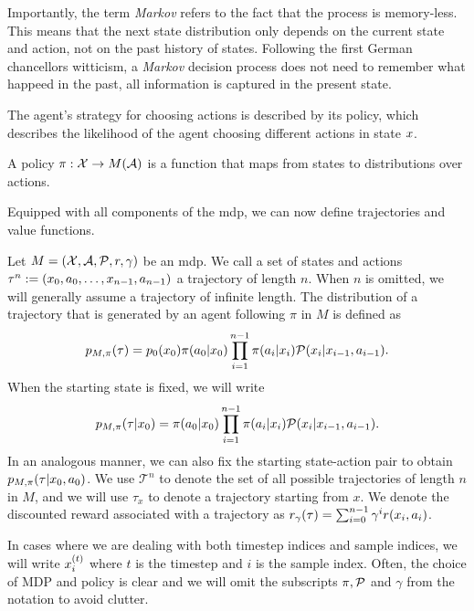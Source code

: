 Importantly, the term \emph{Markov} refers to the fact that the process is memory-less.
This means that the next state distribution only depends on the current state and action, not on the past history of states.
Following the first German chancellors witticism, a \emph{Markov} decision process does not need to remember what happeed in the past, all information is captured in the present state.

The agent's strategy for choosing actions is described by its policy, which describes the likelihood of the agent choosing different actions in state $\state$.

\begin{definition}[Policy]
    A policy $\pi: \states \rightarrow M(\actions)$ is a function that maps from states to distributions over actions.
\end{definition}

Equipped with all components of the \ac{mdp}, we can now define trajectories and value functions.

\begin{definition}[Trajectories]
    Let $M = (\states,\actions,\mathcal{P},r,\gamma)$ be an \ac{mdp}.
    We call a set of states and actions $\tau^n := (\state_0,a_0,\dots,\state_{n-1},a_{n-1})$ a trajectory of length $n$.
    When $n$ is omitted, we will generally assume a trajectory of infinite length.
    The distribution of a trajectory that is generated by an agent following $\pi$ in $M$ is defined as $$p_{M, \pi}(\tau) = p_0(\state_0) \pi(a_0|\state_0) \prod_{i=1}^{n-1} \pi(a_i|\state_i) \mathcal{P}(\state_i|\state_{i-1},a_{i-1}).$$
    When the starting state is fixed, we will write $$p_{M,\pi}(\tau|\state_0) = \pi(a_0|\state_0) \prod_{i=1}^{n-1} \pi(a_i|\state_i) \mathcal{P}(\state_i|\state_{i-1},a_{i-1}).$$
    In an analogous manner, we can also fix the starting state-action pair to obtain $p_{M,\pi}(\tau|\state_0,a_0)$.
    We use $\mathcal{T}^n$ to denote the set of all possible trajectories of length $n$ in $M$, and we will use $\tau_x$ to denote a trajectory starting from $x$.
    We denote the discounted reward associated with a trajectory as $r_\gamma(\tau) = \sum_{i=0}^{n-1} \gamma^i r(\state_i,a_i)$.
\end{definition}

In cases where we are dealing with both timestep indices and sample indices, we will write $\state^{(t)}_i$ where $t$ is the timestep and $i$ is the sample index.
Often, the choice of MDP and policy is clear and we will omit the subscripts $\pi,\P$ and $\gamma$ from the notation to avoid clutter.

